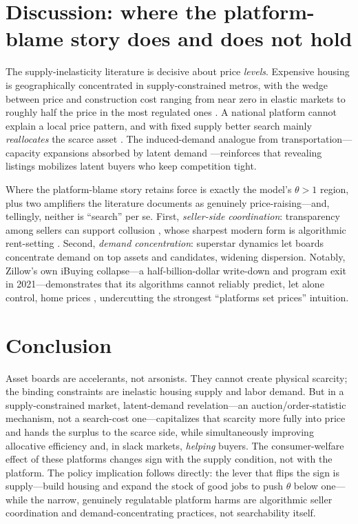 \documentclass[11pt]{article}
\begin{document}
\section{Discussion: where the platform-blame story does and does not hold}

The supply-inelasticity literature is decisive about price \emph{levels}. Expensive housing is
geographically concentrated in supply-constrained metros, with the wedge between price and
construction cost ranging from near zero in elastic markets to roughly half the price in the most
regulated ones \citep{saiz2010,glaesergyourko2005,gyourkomolloy2015}. A national platform cannot
explain a local price pattern, and with fixed supply better search mainly \emph{reallocates} the
scarce asset \citep{kroftpope2014}. The induced-demand analogue from transportation---capacity
expansions absorbed by latent demand \citep{durantonturner2011}---reinforces that revealing listings
mobilizes latent buyers who keep competition tight.

Where the platform-blame story retains force is exactly the model's $\theta>1$ region, plus two
amplifiers the literature documents as genuinely price-raising---and, tellingly, neither is
``search'' per se. First, \emph{seller-side coordination}: transparency among sellers can support
collusion \citep{albaek1997,schultz2005}, whose sharpest modern form is algorithmic rent-setting
\citep{doj2024realpage,cea2024}. Second, \emph{demand concentration}: superstar dynamics
\citep{rosen1981,autor2020} let boards concentrate demand on top assets and candidates, widening
dispersion. Notably, Zillow's own iBuying collapse---a half-billion-dollar write-down and program
exit in 2021---demonstrates that its algorithms cannot reliably predict, let alone control, home
prices \citep{ibuyers2021}, undercutting the strongest ``platforms set prices'' intuition.

\section{Conclusion}

Asset boards are accelerants, not arsonists. They cannot create physical scarcity; the binding
constraints are inelastic housing supply and labor demand. But in a supply-constrained market,
latent-demand revelation---an auction/order-statistic mechanism, not a search-cost one---capitalizes
that scarcity more fully into price and hands the surplus to the scarce side, while simultaneously
improving allocative efficiency and, in slack markets, \emph{helping} buyers. The consumer-welfare
effect of these platforms changes sign with the supply condition, not with the platform. The policy
implication follows directly: the lever that flips the sign is supply---build housing and expand the
stock of good jobs to push $\theta$ below one---while the narrow, genuinely regulatable platform harms
are algorithmic seller coordination and demand-concentrating practices, not searchability itself.
\end{document}
